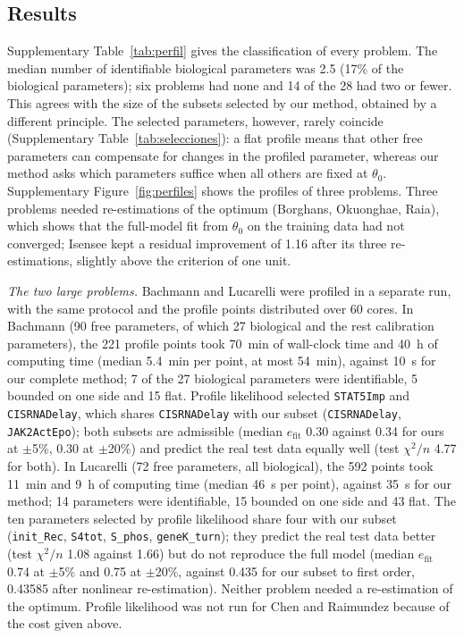 \subsection*{Results}
Supplementary Table~\ref{tab:perfil} gives the classification of every problem. The median number of identifiable biological parameters was 2.5 (17\% of the biological parameters); six problems had none and 14 of the 28 had two or fewer. This agrees with the size of the subsets selected by our method, obtained by a different principle. The selected parameters, however, rarely coincide (Supplementary Table~\ref{tab:selecciones}): a flat profile means that other free parameters can compensate for changes in the profiled parameter, whereas our method asks which parameters suffice when all others are fixed at $\theta_0$. Supplementary Figure~\ref{fig:perfiles} shows the profiles of three problems. Three problems needed re-estimations of the optimum (Borghans, Okuonghae, Raia), which shows that the full-model fit from $\theta_0$ on the training data had not converged; Isensee kept a residual improvement of 1.16 after its three re-estimations, slightly above the criterion of one unit.

\emph{The two large problems.} Bachmann and Lucarelli were profiled in a separate run, with the same protocol and the profile points distributed over 60 cores. In Bachmann (90 free parameters, of which 27 biological and the rest calibration parameters), the 221 profile points took 70~min of wall-clock time and 40~h of computing time (median 5.4~min per point, at most 54~min), against 10~s for our complete method; 7 of the 27 biological parameters were identifiable, 5 bounded on one side and 15 flat. Profile likelihood selected \texttt{STAT5Imp} and \texttt{CISRNADelay}, which shares \texttt{CISRNADelay} with our subset (\texttt{CISRNADelay}, \texttt{JAK2ActEpo}); both subsets are admissible (median $e_{\mathrm{fit}}$ 0.30 against 0.34 for ours at $\pm$5\%, 0.30 at $\pm$20\%) and predict the real test data equally well (test $\chi^2/n$ 4.77 for both). In Lucarelli (72 free parameters, all biological), the 592 points took 11~min and 9~h of computing time (median 46~s per point), against 35~s for our method; 14 parameters were identifiable, 15 bounded on one side and 43 flat. The ten parameters selected by profile likelihood share four with our subset (\texttt{init\_Rec}, \texttt{S4tot}, \texttt{S\_phos}, \texttt{geneK\_turn}); they predict the real test data better (test $\chi^2/n$ 1.08 against 1.66) but do not reproduce the full model (median $e_{\mathrm{fit}}$ 0.74 at $\pm$5\% and 0.75 at $\pm$20\%, against 0.435 for our subset to first order, 0.43585 after nonlinear re-estimation). Neither problem needed a re-estimation of the optimum. Profile likelihood was not run for Chen and Raimundez because of the cost given above.

